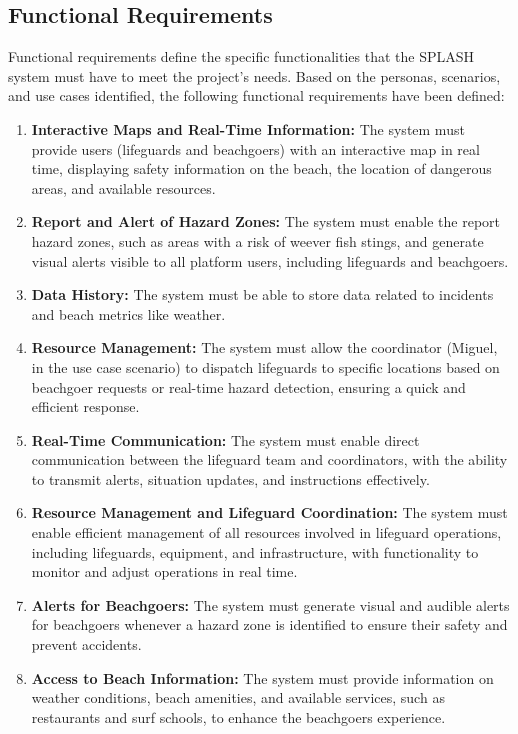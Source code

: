 \subsection{Functional Requirements}
Functional requirements define the specific functionalities that the SPLASH system must have to meet the project's needs. Based on the personas, scenarios, and use cases identified, the following functional requirements have been defined:
\begin{enumerate}
    \item \textbf{Interactive Maps and Real-Time Information: } The system must provide users (lifeguards and beachgoers) with an interactive map in real time, displaying safety information on the beach, the location of dangerous areas, and available resources.
    \item \textbf{Report and Alert of Hazard Zones:} The system must enable the report hazard zones, such as areas with a risk of weever fish stings, and generate visual alerts visible to all platform users, including lifeguards and beachgoers.
    \item \textbf{Data History:} The system must be able to store data related to incidents and beach metrics like weather.  
    \item \textbf{Resource Management: } The system must allow the coordinator (Miguel, in the use case scenario) to dispatch lifeguards to specific locations based on beachgoer requests or real-time hazard detection, ensuring a quick and efficient response.
    \item \textbf{Real-Time Communication:} The system must enable direct communication between the lifeguard team and coordinators, with the ability to transmit alerts, situation updates, and instructions effectively.
    \item \textbf{Resource Management and Lifeguard Coordination:} The system must enable efficient management of all resources involved in lifeguard operations, including lifeguards, equipment, and infrastructure, with functionality to monitor and adjust operations in real time.
    \item \textbf{Alerts for Beachgoers:} The system must generate visual and audible alerts for beachgoers whenever a hazard zone is identified to ensure their safety and prevent accidents.
    \item \textbf{Access to Beach Information: } The system must provide information on weather conditions, beach amenities, and available services, such as restaurants and surf schools, to enhance the beachgoers experience.
    
\end{enumerate}

